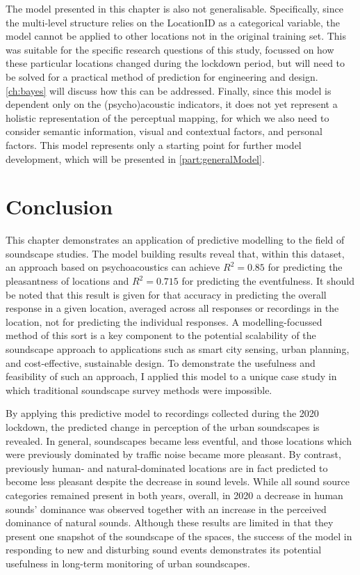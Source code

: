    The model presented in this chapter is also not generalisable. Specifically, since the multi-level structure relies on the LocationID as a categorical variable, the model cannot be applied to other locations not in the original training set. This was suitable for the specific research questions of this study, focussed on how these particular locations changed during the lockdown period, but will need to be solved for a practical method of prediction for engineering and design. \cref{ch:bayes} will discuss how this can be addressed. Finally, since this model is dependent only on the (psycho)acoustic indicators, it does not yet represent a holistic representation of the perceptual mapping, for which we also need to consider semantic information, visual and contextual factors, and personal factors. This model represents only a starting point for further model development, which will be presented in \cref{part:generalModel}.


\section{Conclusion}

 This chapter demonstrates an application of predictive modelling to the field of soundscape studies. The model building results reveal that, within this dataset, an approach based on psychoacoustics can achieve $R^2=0.85$ for predicting the pleasantness of locations and $R^2=0.715$ for predicting the eventfulness. It should be noted that this result is given for that accuracy in predicting the overall response in a given location, averaged across all responses or recordings in the location, not for predicting the individual responses. A modelling-focussed method of this sort is a key component to the potential scalability of the soundscape approach to applications such as smart city sensing, urban planning, and cost-effective, sustainable design. To demonstrate the usefulness and feasibility of such an approach, I applied this model to a unique case study in which traditional soundscape survey methods were impossible.

 By applying this predictive model to recordings collected during the 2020 lockdown, the predicted change in perception of the urban soundscapes is revealed. In general, soundscapes became less eventful, and those locations which were previously dominated by traffic noise became more pleasant. By contrast, previously human- and natural-dominated locations are in fact predicted to become less pleasant despite the decrease in sound levels. While all sound source categories remained present in both years, overall, in 2020 a decrease in human sounds' dominance was observed together with an increase in the perceived dominance of natural sounds. Although these results are limited in that they present one snapshot of the soundscape of the spaces, the success of the model in responding to new and disturbing sound events demonstrates its potential usefulness in long-term monitoring of urban soundscapes.

